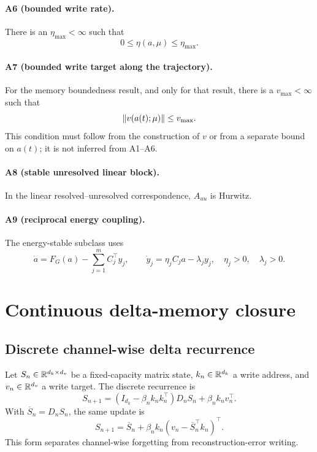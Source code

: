 \paragraph{A6 (bounded write rate).}
There is an $\eta_{\max}<\infty$ such that
\begin{equation}
 0\le\eta(a,\mu)\le\eta_{\max}.
 \label{eq:eta-bound}
\end{equation}

\paragraph{A7 (bounded write target along the trajectory).}
For the memory boundedness result, and only for that result, there is a
$v_{\max}<\infty$ such that
\begin{equation}
 \left\lVert v(a(t);\mu)\right\rVert\le v_{\max}.
 \label{eq:v-bound}
\end{equation}
This condition must follow from the construction of $v$ or from a separate
bound on $a(t)$; it is not inferred from A1--A6.

\paragraph{A8 (stable unresolved linear block).}
In the linear resolved--unresolved correspondence,
$A_{uu}$ is Hurwitz.

\paragraph{A9 (reciprocal energy coupling).}
The energy-stable subclass uses
\begin{equation}
 \dot a=F_G(a)-\sum_{j=1}^{m}C_j^\top y_j,\qquad
 \dot y_j=\eta_jC_ja-\lambda_jy_j,
 \quad \eta_j>0,\quad\lambda_j>0.
 \label{eq:reciprocal-model-assumption}
\end{equation}

\section{Continuous delta-memory closure}
\label{sec:continuous-memory}

\subsection{Discrete channel-wise delta recurrence}
\label{sec:discrete-recurrence}

Let $S_n\in\mathbb{R}^{d_k\times d_v}$ be a fixed-capacity matrix state,
$k_n\in\mathbb{R}^{d_k}$ a write address, and $v_n\in\mathbb{R}^{d_v}$ a write target.
The discrete recurrence is
\begin{equation}
 S_{n+1}
 =(I_{d_k}-\beta_nk_nk_n^\top)D_nS_n+\beta_nk_nv_n^\top.
 \label{eq:discrete-delta}
\end{equation}
With $\overline S_n=D_nS_n$, the same update is
\begin{equation}
 S_{n+1}
 =\overline S_n+\beta_nk_n
   (v_n-\overline S_n^\top k_n)^\top.
 \label{eq:erase-write}
\end{equation}
This form separates channel-wise forgetting from reconstruction-error
writing.

